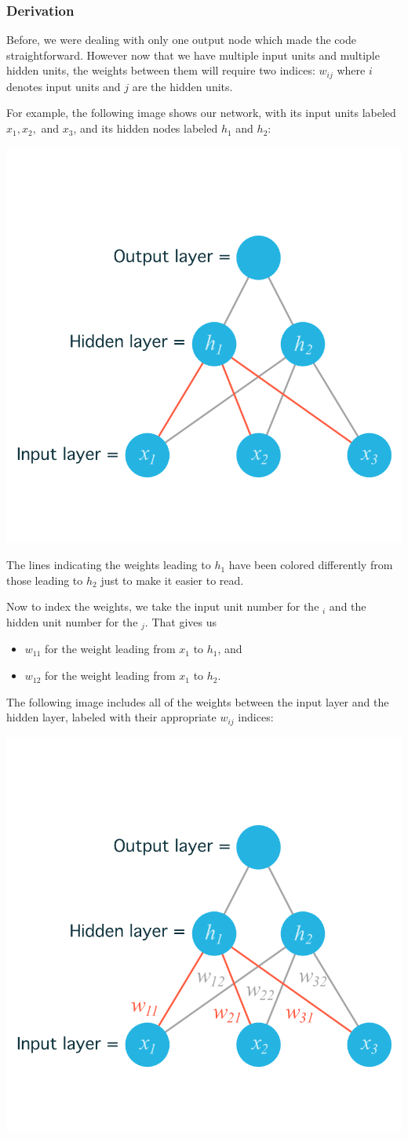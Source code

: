 \subsubsection{Derivation}
Before, we were dealing with only one output node which made the code straightforward. However now that we have multiple input units and multiple hidden units, the weights between them will require two indices: \(w_{ij}\) where \(i\) denotes input units and \(j\) are the hidden units. \newline

For example, the following image shows our network, with its input units labeled \(x_1, x_2,\) and \(x_3\), and its hidden nodes labeled \(h_1\) and \(h_2\):

 \includegraphics[width=0.5\linewidth]{img//intro//network-with-labeled-nodes.png}

The lines indicating the weights leading to \(h_1\) have been colored differently from those leading to \(h_2\) just to make it easier to read. \newline

Now to index the weights, we take the input unit number for the \(_i\) and the hidden unit number for the \(_j\). That gives us
\begin{itemize}
    \item \(w_{11}\) for the weight leading from \(x_1\) to \(h_1\), and
    \item \(w_{12}\) for the weight leading  from \(x_1\) to \(h_2\).
\end{itemize}

The following image includes all of the weights between the input layer and the hidden layer, labeled with their appropriate \(w_{ij}\) indices:

\includegraphics[width=0.5\linewidth]{img//intro//network-with-labeled-weights.png}

